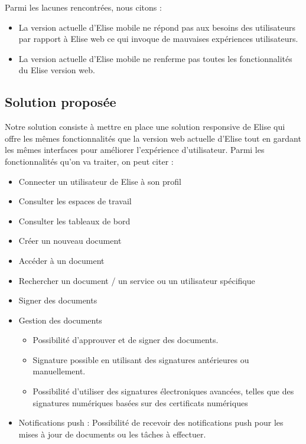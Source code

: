 Parmi les lacunes rencontrées, nous citons :
\begin{itemize}
  \item La version actuelle d'Elise mobile ne répond pas aux besoins des utilisateurs par rapport à Elise web ce qui invoque de mauvaises expériences utilisateurs.
  \item La version actuelle d'Elise mobile ne renferme pas toutes les fonctionnalités du Elise version web.
\end{itemize}

\subsection{Solution proposée}
Notre solution consiste à mettre en place une solution responsive de Elise qui offre les mêmes fonctionnalités que la version web actuelle d'Elise tout en gardant les mêmes interfaces pour améliorer l'expérience d'utilisateur. Parmi les fonctionnalités qu'on va traiter, on peut citer :

\begin{itemize}
  \item Connecter un utilisateur de Elise à son profil
  \item Consulter les espaces de travail
  \item	Consulter les tableaux de bord
  \item	Créer un nouveau document
  \item Accéder à un document
  \item Rechercher un document / un service ou un utilisateur spécifique
  \item Signer des documents
  \item	Gestion des documents
  \begin{itemize}
    \item Possibilité d'approuver et de signer des documents.
    \item Signature possible en utilisant des signatures antérieures ou manuellement.
    \item Possibilité d'utiliser des signatures électroniques avancées, telles que des signatures numériques basées sur des certificats numériques
  \end{itemize}
  \item Notifications push : Possibilité de recevoir des notifications push pour les mises à jour de documents ou les tâches à effectuer.
\end{itemize}

